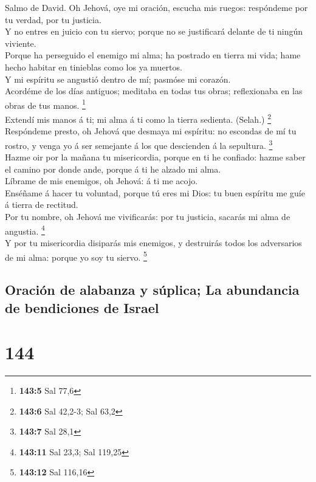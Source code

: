  Salmo de David. Oh Jehová, oye mi oración, escucha mis
ruegos: respóndeme por tu verdad, por tu justicia.\\
 Y no entres en juicio con tu siervo; porque no se
justificará delante de ti ningún viviente.\\
 Porque ha perseguido el enemigo mi alma; ha postrado en
tierra mi vida; hame hecho habitar en tinieblas como los ya muertos.\\
 Y mi espíritu se angustió dentro de mí; pasmóse mi
corazón.\\
 Acordéme de los días antiguos; meditaba en todas tus obras;
reflexionaba en las obras de tus manos. \footnote{\textbf{143:5} Sal
  77,6}\\
 Extendí mis manos á ti; mi alma á ti como la tierra
sedienta. (Selah.) \footnote{\textbf{143:6} Sal 42,2-3; Sal 63,2}\\
 Respóndeme presto, oh Jehová que desmaya mi espíritu: no
escondas de mí tu rostro, y venga yo á ser semejante á los que
descienden á la sepultura. \footnote{\textbf{143:7} Sal 28,1}\\
 Hazme oir por la mañana tu misericordia, porque en ti he
confiado: hazme saber el camino por donde ande, porque á ti he alzado mi
alma.\\
 Líbrame de mis enemigos, oh Jehová: á ti me acojo.\\
 Enséñame á hacer tu voluntad, porque tú eres mi Dios: tu
buen espíritu me guíe á tierra de rectitud.\\
 Por tu nombre, oh Jehová me vivificarás: por tu justicia,
sacarás mi alma de angustia. \footnote{\textbf{143:11} Sal 23,3; Sal
  119,25}\\
 Y por tu misericordia disiparás mis enemigos, y destruirás
todos los adversarios de mi alma: porque yo soy tu siervo. \footnote{\textbf{143:12}
  Sal 116,16}

\hypertarget{oraciuxf3n-de-alabanza-y-suxfaplica-la-abundancia-de-bendiciones-de-israel}{%
\subsection{Oración de alabanza y súplica; La abundancia de bendiciones
de
Israel}\label{oraciuxf3n-de-alabanza-y-suxfaplica-la-abundancia-de-bendiciones-de-israel}}

\hypertarget{section-143}{%
\section{144}\label{section-143}}


